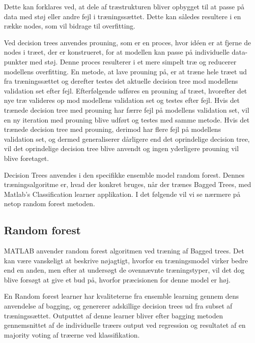 Dette kan forklares ved, at dele af træstrukturen bliver opbygget til at passe på data med støj eller andre fejl i træningssættet. Dette kan således resultere i en række nodes, som vil bidrage til overfitting.

Ved decision trees anvendes prouning, som er en proces, hvor idéen er at fjerne de nodes i træet, der er konstrueret, for at modellen kan passe på individuelle data-punkter med støj. Denne proces resulterer i et mere simpelt træ og reducerer modellens overfitting. 
En metode, at lave prouning på, er at træne hele træet ud fra træningssættet og derefter testes det aktuelle decision tree mod modellens validation set efter fejl. Efterfølgende udføres en prouning af træet, hvorefter det nye træ valideres op mod modellens validation set og testes efter fejl. Hvis det trænede decision tree med prouning har færre fejl på modellens validation set, vil en ny iteration med prouning blive udført og testes med samme metode. Hvis det trænede decision tree med prouning, derimod har flere fejl på modellens validation set, og dermed generaliserer dårligere end det oprindelige decision tree, vil det oprindelige decision tree blive anvendt og ingen yderligere prouning vil blive foretaget. 

Decision Trees anvendes i den specifikke ensemble model random forest. Dennes træningsalgoritme er, hvad der konkret bruges, når der trænes Bagged Trees, med Matlab’s Classification learner applikation. I det følgende vil vi se nærmere på netop random forest metoden.

\subsection{Random forest}
MATLAB anvender random forest algoritmen ved træning af Bagged trees. Det kan være vanskeligt at beskrive nøjagtigt, hvorfor en træningsmodel virker bedre end en anden, men efter at undersøgt de ovennævnte træningstyper, vil det dog blive forsøgt at give et bud på, hvorfor præcisionen for denne model er høj.

En Random forest learner har kvaliteterne fra ensemble learning gennem dens anvendelse af bagging, og genererer adskillige decision trees ud fra subset af træningssættet. Outputtet af denne learner bliver efter bagging metoden gennemsnittet af de individuelle træers output ved regression og resultatet af en majority voting af træerne ved klassifikation. 

